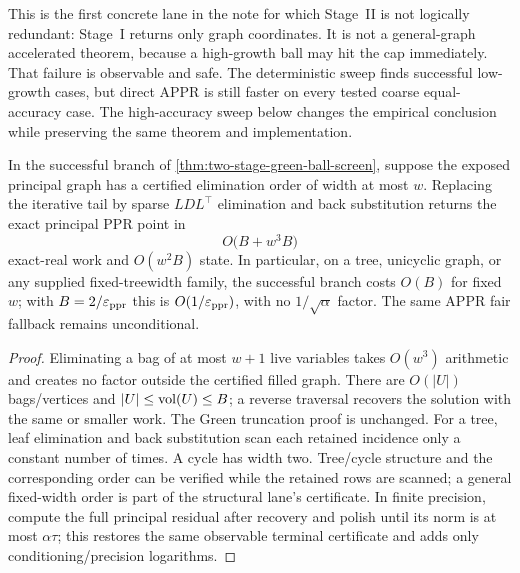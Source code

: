 This is the first concrete lane in the note for which Stage~II is not
logically redundant: Stage~I returns only graph coordinates.  It is not a
general-graph accelerated theorem, because a high-growth ball may hit the cap
immediately.  That failure is observable and safe.  The deterministic sweep
finds successful low-growth cases, but direct APPR is still faster on every
tested coarse equal-accuracy case.  The high-accuracy sweep below changes the
empirical conclusion while preserving the same theorem and implementation.

\begin{corollary}
\label{cor:two-stage-green-structural-tail}
In the successful branch of
\cref{thm:two-stage-green-ball-screen}, suppose the exposed principal graph
has a certified elimination order of width at most $w$.  Replacing the
iterative tail by sparse $LDL^\top$ elimination and back substitution returns
the exact principal PPR point in
\begin{equation}
 O\bigl(B+w^3B\bigr)
 \label{eq:two-stage-green-structural-work}
\end{equation}
exact-real work and $O(w^2B)$ state.  In particular, on a tree, unicyclic
graph, or any supplied fixed-treewidth family, the successful branch costs
$O(B)$ for fixed $w$; with $B=2/\varepsilon_{\mathrm{ppr}}$ this is $O(1/\varepsilon_{\mathrm{ppr}})$, with no
$1/\sqrt\alpha$ factor.  The same APPR fair fallback remains unconditional.
\end{corollary}

\begin{proof}
Eliminating a bag of at most $w+1$ live variables takes $O(w^3)$ arithmetic
and creates no factor outside the certified filled graph.  There are
$O(|U|)$ bags/vertices and $|U|\leq\operatorname{vol}(U)\leq B$; a reverse traversal
recovers the solution with the same or smaller work.  The Green truncation
proof is unchanged.  For a tree, leaf elimination and back substitution scan
each retained incidence only a constant number of times.  A cycle has width
two.  Tree/cycle structure and the corresponding order can be verified while
the retained rows are scanned; a general fixed-width order is part of the
structural lane's certificate.  In finite precision, compute the full
principal residual after recovery and polish until its norm is at most
$\alpha\tau$; this restores the same observable terminal certificate and
adds only conditioning/precision logarithms.
\end{proof}

